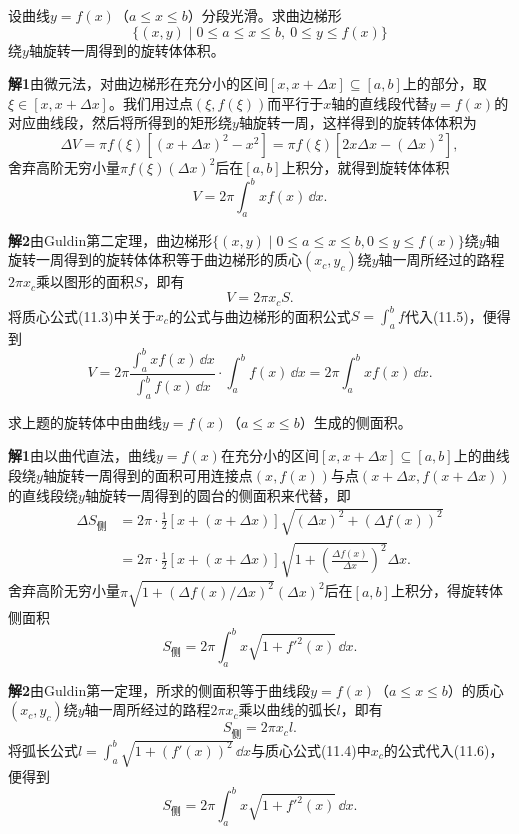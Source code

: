 \begin{xexample}[11.1.5]
设曲线$y=f(x)$（$a\le x\le b$）分段光滑。求曲边梯形
\[
  \{(x,y)\mid 0\le a\le x\le b,\ 0\le y\le f(x)\}
\]
绕$y$轴旋转一周得到的旋转体体积。
\end{xexample}
\begin{xsolution}
\textbf{解1}\quad 由微元法，对曲边梯形在充分小的区间$[x,x+\Delta x]\subseteq[a,b]$上的部分，取$\xi\in[x,x+\Delta x]$。我们用过点$(\xi,f(\xi))$而平行于$x$轴的直线段代替$y=f(x)$的对应曲线段，然后将所得到的矩形绕$y$轴旋转一周，这样得到的旋转体体积为
\[
  \Delta V=\pi f(\xi)[(x+\Delta x)^2-x^2]
  =\pi f(\xi)[2x\Delta x-(\Delta x)^2],
\]
舍弃高阶无穷小量$\pi f(\xi)(\Delta x)^2$后在$[a,b]$上积分，就得到旋转体体积
\[
  V=2\pi\int_a^bxf(x)\,\dd x.
\]

\textbf{解2}\quad 由Guldin第二定理，曲边梯形$\{(x,y)\mid 0\le a\le x\le b,0\le y\le f(x)\}$绕$y$轴旋转一周得到的旋转体体积等于曲边梯形的质心$(x_c,y_c)$绕$y$轴一周所经过的路程$2\pi x_c$乘以图形的面积$S$，即有
\begin{equation}
  V=2\pi x_cS.
  \tag{11.5}
  \label{eq:11.5}
\end{equation}
将质心公式(11.3)中关于$x_c$的公式与曲边梯形的面积公式$S=\int_a^bf$代入(11.5)，便得到
\[
  V=2\pi\frac{\int_a^bxf(x)\,\dd x}{\int_a^bf(x)\,\dd x}\cdot\int_a^bf(x)\,\dd x
  =2\pi\int_a^bxf(x)\,\dd x.
\]
\end{xsolution}

\begin{xexample}[11.1.6]
求上题的旋转体中由曲线$y=f(x)$（$a\le x\le b$）生成的侧面积。
\end{xexample}
\begin{xsolution}
\textbf{解1}\quad 由以曲代直法，曲线$y=f(x)$在充分小的区间$[x,x+\Delta x]\subseteq[a,b]$上的曲线段绕$y$轴旋转一周得到的面积可用连接点$(x,f(x))$与点$(x+\Delta x,f(x+\Delta x))$的直线段绕$y$轴旋转一周得到的圆台的侧面积来代替，即
\begin{align*}
\Delta S_{\text{侧}}
&=2\pi\cdot\frac12[x+(x+\Delta x)]\sqrt{(\Delta x)^2+(\Delta f(x))^2}\\
&=2\pi\cdot\frac12[x+(x+\Delta x)]\sqrt{1+\left(\frac{\Delta f(x)}{\Delta x}\right)^2}\Delta x.
\end{align*}
舍弃高阶无穷小量$\pi\sqrt{1+(\Delta f(x)/\Delta x)^2}(\Delta x)^2$后在$[a,b]$上积分，得旋转体侧面积
\[
  S_{\text{侧}}=2\pi\int_a^bx\sqrt{1+f'^2(x)}\,\dd x.
\]

\textbf{解2}\quad 由Guldin第一定理，所求的侧面积等于曲线段$y=f(x)$（$a\le x\le b$）的质心$(x_c,y_c)$绕$y$轴一周所经过的路程$2\pi x_c$乘以曲线的弧长$l$，即有
\begin{equation}
  S_{\text{侧}}=2\pi x_cl.
  \tag{11.6}
  \label{eq:11.6}
\end{equation}
将弧长公式$l=\int_a^b\sqrt{1+(f'(x))^2}\,\dd x$与质心公式(11.4)中$x_c$的公式代入(11.6)，便得到
\[
  S_{\text{侧}}=2\pi\int_a^bx\sqrt{1+f'^2(x)}\,\dd x.
\]
\end{xsolution}

